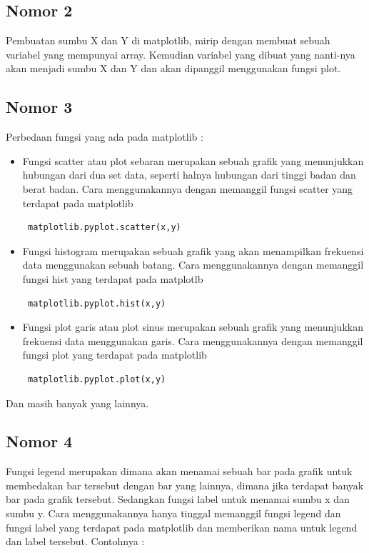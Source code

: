 	\subsection{Nomor 2}
	Pembuatan sumbu X dan Y di matplotlib, mirip dengan membuat sebuah variabel yang mempunyai array. Kemudian variabel yang dibuat yang nanti-nya akan menjadi sumbu X dan Y dan akan dipanggil menggunakan fungsi plot.
		
	
	\subsection{Nomor 3}
	Perbedaan fungsi yang ada pada matplotlib :
		\begin{itemize}
			\item Fungsi scatter atau plot sebaran merupakan sebuah grafik yang menunjukkan hubungan dari dua set data, seperti halnya hubungan dari tinggi badan dan berat badan.
			Cara menggunakannya dengan memanggil fungsi scatter yang terdapat pada matplotlib \begin{verbatim} matplotlib.pyplot.scatter(x,y) \end{verbatim}
			
			\item Fungsi histogram merupakan sebuah grafik yang akan menampilkan frekuensi data menggunakan sebuah batang.
			Cara menggunakannya dengan memanggil fungsi hist yang terdapat pada matplotlb \begin{verbatim} matplotlib.pyplot.hist(x,y) \end{verbatim}
			
			\item Fungsi plot garis atau plot sinus merupakan sebuah grafik yang menunjukkan frekuensi data menggunakan garis.
			Cara menggunakannya dengan memanggil fungsi plot yang terdapat pada matplotlib \begin{verbatim} matplotlib.pyplot.plot(x,y) \end{verbatim}
			
		\end{itemize}
	Dan masih banyak yang lainnya.
	\subsection{Nomor 4}
	Fungsi legend merupakan dimana akan menamai sebuah bar pada grafik untuk membedakan bar tersebut dengan bar yang lainnya, dimana jika terdapat banyak bar pada grafik tersebut. Sedangkan fungsi label untuk menamai sumbu x dan sumbu y.
	Cara menggunakannya hanya tinggal memanggil fungsi legend dan fungsi label yang terdapat pada matplotlib dan memberikan nama untuk legend dan label tersebut. Contohnya :
		
	
